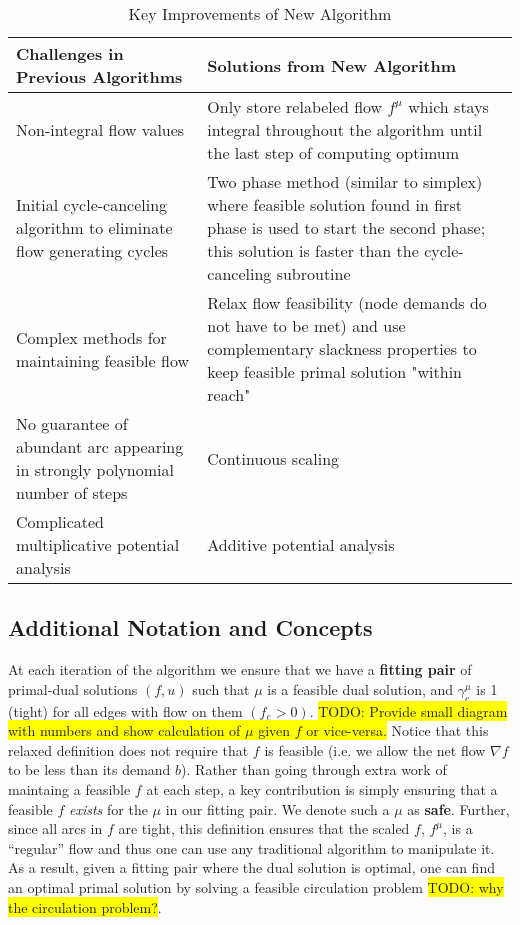 \documentclass{article}
\newcommand{\todo}[1]{\colorbox{yellow}{TODO: #1}}
\begin{document}
\begin{table}[H]
\begin{center}
    \begin{tabular}{ | p{7cm} | p{7cm} |}
    \hline
    Challenges in Previous Algorithms  & Solutions from New Algorithm \\ \hline
    Non-integral flow values & Only store relabeled flow $f^{\mu}$ which stays integral throughout the algorithm until the last step of computing optimum \\ \hline
    Initial cycle-canceling algorithm to eliminate flow generating cycles & Two phase method (similar to simplex) where feasible solution found in first phase is used to start the second phase; this solution is faster than the cycle-canceling subroutine \\ \hline
    Complex methods for maintaining feasible flow & Relax flow feasibility (node demands do not have to be met) and use complementary slackness properties to keep feasible primal solution "within reach" \\ \hline
    No guarantee of abundant arc appearing in strongly polynomial number of steps \cite{Radzik2004} &  Continuous scaling\\ \hline
    Complicated multiplicative potential analysis \cite{Vegh2013} & Additive potential analysis \\
    \hline
    \end{tabular}
\end{center}
\caption{Key Improvements of New Algorithm}
\label{tab:improvements}
\end{table}
    \subsection{Additional Notation and Concepts}
At each iteration of the algorithm we ensure that we have a \textbf{fitting pair} of primal-dual solutions $(f,u)$ such that $\mu$ is a feasible dual solution, and $\gamma_e^{\mu}$ is 1 (tight) for all edges with flow on them $(f_e > 0)$. \todo{Provide small diagram with numbers and show calculation of $\mu$ given $f$ or vice-versa.} Notice that this relaxed definition does not require that $f$ is feasible (i.e. we allow the net flow $\nabla f $ to be less than its demand $b$). Rather than going through extra work of maintaing a feasible $f$ at each step, a key contribution is simply ensuring that a feasible $f$ \textit{exists} for the $\mu$ in our fitting pair. We denote such a $\mu$ as \textbf{safe}. Further, since all arcs in $f$ are tight, this definition ensures that the scaled $f$, $f^{\mu}$, is a ``regular'' flow and thus one can use any traditional algorithm to manipulate it. As a result, given a fitting pair where the dual solution is optimal, one can find an optimal primal solution by solving a feasible circulation problem \todo{why the circulation problem?}. 
\end{document}
